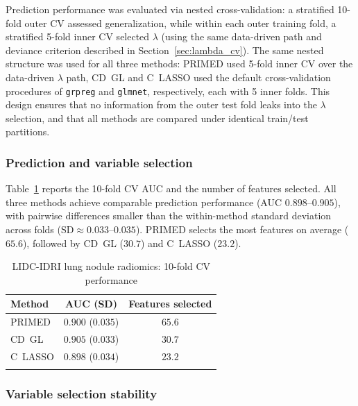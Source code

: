 \documentclass[referee,lineno,pdflatex,sn-vancouver-num]{sn-jnl}
\begin{document}
Prediction performance was evaluated via nested cross-validation: a stratified 10-fold outer CV assessed generalization, while within each outer training fold, a stratified 5-fold inner CV selected $\lambda$ (using the same data-driven path and deviance criterion described in Section~\ref{sec:lambda_cv}).
The same nested structure was used for all three methods: PRIMED used 5-fold inner CV over the data-driven $\lambda$ path, CD~GL and C~LASSO used the default cross-validation procedures of \texttt{grpreg} and \texttt{glmnet}, respectively, each with 5 inner folds.
This design ensures that no information from the outer test fold leaks into the $\lambda$ selection, and that all methods are compared under identical train/test partitions.

\subsubsection{Prediction and variable selection}

Table~\ref{tab:lidc_auc} reports the 10-fold CV AUC and the number of features selected.
All three methods achieve comparable prediction performance (AUC $0.898$--$0.905$), with pairwise differences smaller than the within-method standard deviation across folds ($\mathrm{SD} \approx 0.033$--$0.035$).
PRIMED selects the most features on average ($65.6$), followed by CD~GL ($30.7$) and C~LASSO ($23.2$).

\begin{table}[h]
\caption{LIDC-IDRI lung nodule radiomics: 10-fold CV performance}\label{tab:lidc_auc}
\small
\renewcommand{\arraystretch}{1.1}
\begin{tabular*}{\textwidth}{@{\extracolsep\fill}lcc}
\toprule
Method & AUC (SD) & Features selected \\
\midrule
PRIMED  & $0.900$ ($0.035$) & $65.6$ \\
CD~GL   & $0.905$ ($0.033$) & $30.7$ \\
C~LASSO & $0.898$ ($0.034$) & $23.2$ \\
\botrule
\end{tabular*}
\end{table}

\subsubsection{Variable selection stability}
\end{document}
